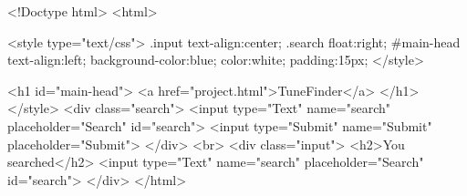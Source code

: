 <!Doctype html>
<html>

<style type="text/css">
	.input{
	text-align:center;
	}
	.search{
	float:right;
	}
	#main-head{
	text-align:left;
	background-color:blue;
	color:white;
	padding:15px;
	}
	</style>

<h1 id="main-head">
<a href="\Users{}\Documents\Senior project\homepage.html">TuneFinder</a>
</h1>
	</style>
	<div class="search">
<input type="Text" name="search" placeholder="Search" id="search">
<input type="Submit" name="Submit" placeholder="Submit">
</div>
<br>
<div class="input">
<h2>You searched</h2>
<input type="Text" name="search" placeholder="Search" id="search">
</div>
</html>